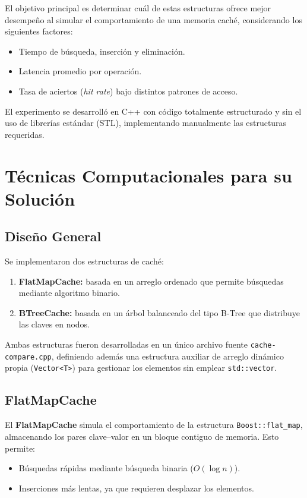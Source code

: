 \documentclass[12pt,a4paper]{article}
\begin{document}
El objetivo principal es determinar cuál de estas estructuras ofrece mejor desempeño al simular el comportamiento de una memoria caché,  
considerando los siguientes factores:
\begin{itemize}
    \item Tiempo de búsqueda, inserción y eliminación.
    \item Latencia promedio por operación.
    \item Tasa de aciertos (\textit{hit rate}) bajo distintos patrones de acceso.
\end{itemize}

El experimento se desarrolló en C++ con código totalmente estructurado y sin el uso de librerías estándar (STL),  
implementando manualmente las estructuras requeridas.

\section{Técnicas Computacionales para su Solución}

\subsection{Diseño General}

Se implementaron dos estructuras de caché:

\begin{enumerate}
    \item \textbf{FlatMapCache:} basada en un arreglo ordenado que permite búsquedas mediante algoritmo binario.
    \item \textbf{BTreeCache:} basada en un árbol balanceado del tipo B-Tree que distribuye las claves en nodos.
\end{enumerate}

Ambas estructuras fueron desarrolladas en un único archivo fuente \texttt{cache-compare.cpp},  
definiendo además una estructura auxiliar de arreglo dinámico propia (\texttt{Vector<T>})  
para gestionar los elementos sin emplear \texttt{std::vector}.

\subsection{FlatMapCache}

El \textbf{FlatMapCache} simula el comportamiento de la estructura \texttt{Boost::flat\_map}, almacenando los pares clave–valor en un bloque contiguo de memoria.  
Esto permite:
\begin{itemize}
    \item Búsquedas rápidas mediante búsqueda binaria (\(O(\log n)\)).
    \item Inserciones más lentas, ya que requieren desplazar los elementos.
\end{itemize}
\end{document}
